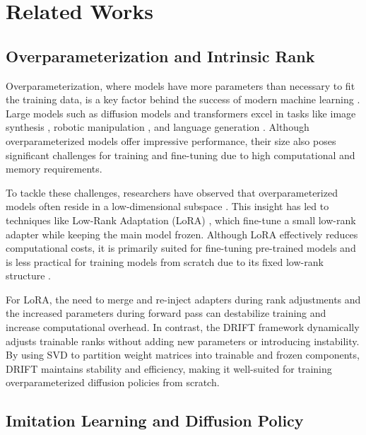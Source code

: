 \section{Related Works}
\label{sec:related_works}

\subsection{Overparameterization and Intrinsic Rank}
\label{sec:overparam_and_rank}
Overparameterization, where models have more parameters than necessary to fit the training data, is a key factor behind the success of modern machine learning \cite{krizhevsky2012imagenet, kaplan2020scaling}. Large models such as diffusion models \cite{ho2020denoising} and transformers \cite{vaswani2017attention} excel in tasks like image synthesis \cite{rombach2022high}, robotic manipulation \cite{chi_dp}, and language generation \cite{zhao2023survey}. Although overparameterized models offer impressive performance, their size also poses significant challenges for training and fine-tuning due to high computational and memory requirements.

To tackle these challenges, researchers have observed that overparameterized models often reside in a low-dimensional subspace \cite{aghajanyan_intrinsic_dim, li_intrinsic_dim}. This insight has led to techniques like Low-Rank Adaptation (LoRA) \cite{hu_lora, dettmers_qlora}, which fine-tune a small low-rank adapter while keeping the main model frozen. Although LoRA effectively reduces computational costs, it is primarily suited for fine-tuning pre-trained models and is less practical for training models from scratch due to its fixed low-rank structure \cite{liu2024dora}.

For LoRA, the need to merge and re-inject adapters during rank adjustments and the increased parameters during forward pass can destabilize training and increase computational overhead. In contrast, the DRIFT framework dynamically adjusts trainable ranks without adding new parameters or introducing instability. By using SVD to partition weight matrices into trainable and frozen components, DRIFT maintains stability and efficiency, making it well-suited for training overparameterized diffusion policies from scratch.

\subsection{Imitation Learning and Diffusion Policy}
\label{sec:il_dp}


